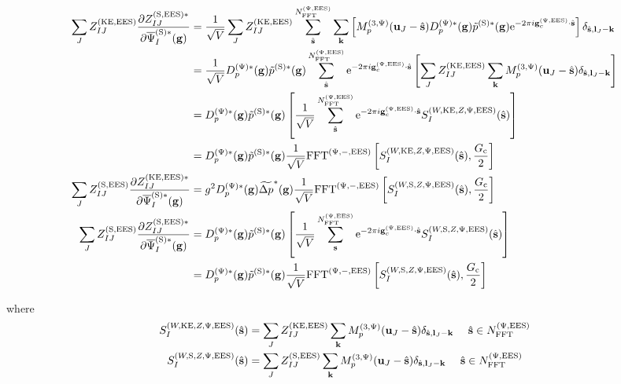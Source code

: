 \documentclass[paper=a4, fontsize=11pt]{article} %
\numberwithin{equation}{section} %
\numberwithin{figure}{section} %
\numberwithin{table}{section} %
\newcommand{\p}{\partial}
\newcommand{\wt}{\widetilde}
\newcommand{\bu}{{\bf{u}}}
\newcommand{\bl}{{\bf{l}}}
\newcommand{\bk}{{\bf{k}}}
\newcommand{\bs}{{\bf{s}}}
\newcommand{\bg}{{\bf{g}}}
\newcommand{\hs}{{\hat{\bf{s}}}}
\newcommand{\rS}{{\mathrm{S}}}
\newcommand{\rKE}{{\mathrm{KE}}}
\newcommand{\rEES}{{\mathrm{EES}}}
\newcommand{\re}{{\mathrm{e}}}
\newcommand{\gcpEES}{{\bg_c^{(\Psi,\rEES)}}}
\newcommand{\psigsc}{{\overline \Psi_I^{(\rS)*}(\bg)}}
\newcommand{\NFFTpEES}{{N^{\mathrm{(\Psi,\rEES})}_{\mathrm{FFT}}}}
\newcommand{\Gc}{{G_{\mathrm{c}}}}
\newcommand{\hGc}{{\frac{G_{\mathrm{c}}}{2}}}
\newcommand{\Dpgc}{{D^{(\Psi)*}_p(\bg)}}
\newcommand{\Mp}{{M_p^{(3,\Psi)}}}
\newcommand{\FFTpiEES}{{\mathrm{FFT}^{(\Psi,-,\rEES)}}}
\newcommand{\hsinpEES}{{\ \ \ \ \hs \in \NFFTpEES}}
\begin{document}
\begin{equation}
\begin{split}
\sum_{J}Z_{IJ}^{(\rKE,\rEES)}\frac{\p Z_{IJ}^{(\rS,\rEES)*}}{ \p \psigsc}
&= \frac{1}{\sqrt{V}} \sum_J Z_{IJ} ^{(\rKE,\rEES)} \sum_{\hat \bs}^{\NFFTpEES} \sum_{\bk} \left[\Mp(\bu_{J}-\hat \bs) \Dpgc \tilde p^{(\rS)*}(\bg)\re^{-2\pi i\gcpEES  \cdot \hat\bs}\right] \delta_{\hat \bs,\bl_J-\bk} \\
&= \frac{1}{\sqrt{V}} \Dpgc \tilde p^{(\rS)*}(\bg) \sum_{\hat \bs}^{\NFFTpEES} \re^{-2\pi i\gcpEES  \cdot \hat\bs} \left[\sum_J Z_{IJ} ^{(\rKE,\rEES)} \sum_{\bk} \Mp(\bu_{J}-\hat \bs) \delta_{\hat \bs,\bl_J-\bk}\right] \\
&=  \Dpgc \tilde p^{(\rS)*}(\bg) \left[\frac{1}{\sqrt{V}}\sum_{\hat \bs}^{\NFFTpEES} \re^{-2\pi i\gcpEES \cdot \hat\bs} S_I^{(W,\rKE,Z,\Psi,\rEES)}(\hs) \right] \\
&=  \Dpgc \tilde p^{(\rS)*}(\bg) \frac{1}{\sqrt{V}} \FFTpiEES \left[ S_I^{(W,\rKE,Z,\Psi,\rEES)}(\hs),\frac{\Gc}{2} \right] \\
\sum_{J}Z_{IJ}^{(\rS,\rEES)}\frac{\p Z_{IJ}^{(\rKE,\rEES)*}}{ \p \psigsc}
&=  g^2 \Dpgc \wt {\Delta p}^*(\bg)\frac{1}{\sqrt{V}} \FFTpiEES \left[ S_I^{(W,\rS,Z,\Psi,\rEES)}(\hs),\hGc \right] \\
\sum_{J}Z_{IJ}^{(\rS,\rEES)}\frac{\p Z_{IJ}^{(\rS,\rEES)*}}{ \p \psigsc}
&= \Dpgc \tilde p^{(\rS)*}(\bg)\left[\frac{1}{\sqrt{V}}\sum_{\bs}^\NFFTpEES \re^{-2\pi i\gcpEES  \cdot \hat\bs} S_I^{(W,\rS,Z,\Psi,\rEES)}(\hs) \right] \\
&=  \Dpgc \tilde p^{(\rS)*}(\bg) \frac{1}{\sqrt{V}} \FFTpiEES \left[ S_I^{(W,\rS,Z,\Psi,\rEES)}(\hs) ,\hGc\right] \\
\end{split}
\end{equation}

where
\begin{equation}
\begin{split}
S_I^{(W,\rKE,Z,\Psi,\rEES)}(\hs) &= \sum_J Z_{IJ} ^{(\rKE,\rEES)} \sum_{\bk} \Mp(\bu_{J}-\hat \bs) \delta_{\hat \bs,\bl_J-\bk} \hsinpEES \\
S_I^{(W,\rS,Z,\Psi,\rEES)}(\hs) &= \sum_J Z_{IJ} ^{(\rS,\rEES)} \sum_{\bk} \Mp(\bu_{J}-\hat \bs) \delta_{\hat \bs,\bl_J-\bk} \hsinpEES \\
\end{split}
\end{equation}
\end{document}
